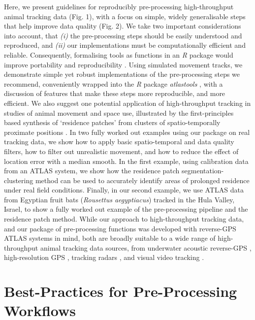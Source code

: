 \begin{refsection}
    Here, we present guidelines for reproducibly pre-processing high-throughput animal tracking data (Fig. 1), with a focus on simple, widely generalisable steps that help improve data quality (Fig. 2).
    We take two important considerations into account, that \textit{(i)} the pre-processing steps should be easily understood and reproduced, and \textit{(ii)} our implementations must be computationally efficient and reliable.
    Consequently, formalising tools as functions in an \textit{R} package would improve portability and reproducibility \cite{marwick2018, wickham2015}.
    Using simulated movement tracks, we demonstrate simple yet robust implementations of the pre-processing steps we recommend, conveniently wrapped into the \textit{R} package \textit{atlastools} \cite{gupte2020a}, with a discussion of features that make these steps more reproducible, and more efficient.
    We also suggest one potential application of high-throughput tracking in studies of animal movement and space use, illustrated by the first-principles based synthesis of `residence patches' from clusters of spatio-temporally proximate positions \cite[\textit{sensu}][]{bijleveld2016, oudman2018, barraquand2008}.
    In two fully worked out examples using our package on real tracking data, we show how to apply basic spatio-temporal and data quality filters, how to filter out unrealistic movement, and how to reduce the effect of location error with a median smooth.
    In the first example, using calibration data from an ATLAS system, we show how the residence patch segmentation-clustering method can be used to accurately identify areas of prolonged residence under real field conditions.
    Finally, in our second example, we use ATLAS data from Egyptian fruit bats (\textit{Rousettus aegyptiacus}) tracked in the Hula Valley, Israel, to show a fully worked out example of the pre-processing pipeline and the residence patch method.
    While our approach to high-throughput tracking data, and our package of pre-processing functions was developed with reverse-GPS ATLAS systems in mind, both are broadly suitable to a wide range of high-throughput animal tracking data sources, from underwater acoustic reverse-GPS \cite{baktoft2019, baktoft2017, jung2015, aspillaga2021, aspillaga2021a}, high-resolution GPS \cite{strandburg-peshkin2015, papageorgiou2019, harel2016, klarevas-irby2021}, tracking radars \cite{horvitz2014}, and visual video tracking \cite{rathore2020, perez-escudero2014}.

    \section*{Best-Practices for Pre-Processing Workflows}


\end{refsection}
